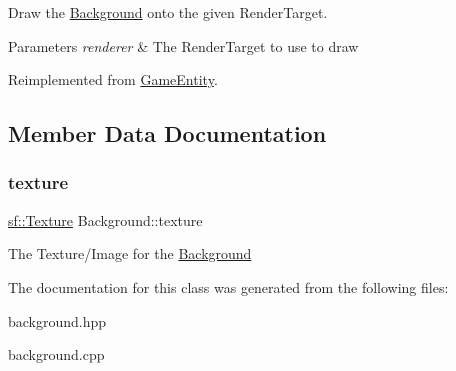 Draw the \mbox{\hyperlink{class_background}{Background}} onto the given Render\+Target. 


\begin{DoxyParams}{Parameters}
{\em renderer} & The Render\+Target to use to draw \\
\hline
\end{DoxyParams}


Reimplemented from \mbox{\hyperlink{class_game_entity_ae8417c4fa668594827706c44091f7366}{Game\+Entity}}.



\subsection{Member Data Documentation}
\mbox{\label{class_background_a6927e190fe6e348232db3c82b5bd0785}} 
\subsubsection{\texorpdfstring{texture}{texture}}
{\footnotesize\ttfamily \mbox{\hyperlink{classsf_1_1_texture}{sf\+::\+Texture}} Background\+::texture\hspace{0.3cm}{\ttfamily [protected]}}

The Texture/\+Image for the \mbox{\hyperlink{class_background}{Background}} 

The documentation for this class was generated from the following files\+:\begin{DoxyCompactItemize}
\item 
background.\+hpp\item 
background.\+cpp\end{DoxyCompactItemize}
